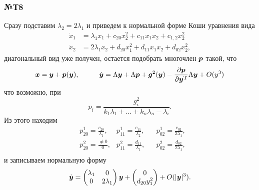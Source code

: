 
\subsubsection*{№Т8}
Сразу подставим $\lambda_2 = 2 \lambda_1$ и приведем к нормальной форме Коши уравнения вида
\begin{align*}
    \dot{x}_1 &= \lambda_1 x_1 + c_{20} x_2^2 + c_{11} x_1 x_2 + c_{1, 2} x_2^2 \\
    \dot{x}_2 &= 2 \lambda_1 x_2 + d_{20} x_1^2 + d_{11} x_1 x_2 +  d_{02} x_2^2,
\end{align*}
диагональный вид уже получен, остается подобрать многочлен $\mbox{\boldmath $p$}$ такой, что
\begin{equation*}
    \mbox{\boldmath $x$} = \mbox{\boldmath $y$} + \mbox{\boldmath $p$}(\mbox{\boldmath $y$}),
    \hspace{1 cm}
    \dot{\mbox{\boldmath $y$}} = \Lambda \mbox{\boldmath $y$} + \Lambda \mbox{\boldmath $p$} + \mbox{\boldmath $g$}^2 (\mbox{\boldmath $y$}) -
    \frac{\partial \mbox{\boldmath $p$}}{\partial \mbox{\boldmath $y$}^{\text{T}}}  \Lambda \mbox{\boldmath $y$} + O(y^3)
\end{equation*}
что возможно, при
\begin{equation*}
     p_i = \frac{g_i^2}{k_1 \lambda_1 + \ldots + k_n \lambda_n - \lambda_i}.
\end{equation*}
Из этого находим
\begin{align*}
    &p_{20}^1 =\frac{c_{20}}{\lambda_1},
    &p_{11}^1 = \frac{c_{11}}{\lambda_2},
    &&p_{02}^1 = \frac{c_{02}}{3 \lambda_1}, \\
    &p_{20}^2 = \frac{\neq 0}{0}, 
    &p_{11}^2 = \frac{d_{11}}{\lambda_1}, 
    &&p_{02}^2 = \frac{d_{02}}{2\lambda_1}, \\
\end{align*}    
и записываем нормальную форму
\begin{equation*}
    \dot{\mbox{\boldmath $y$}} = \begin{pmatrix}
        \lambda_1 & 0 \\
        0 & 2 \lambda_1 \\
    \end{pmatrix} \mbox{\boldmath $y$} + 
    \begin{pmatrix}
        0 \\ d_{20} y_1^2
    \end{pmatrix} + O(|\mbox{\boldmath $y$}|^3).
\end{equation*}